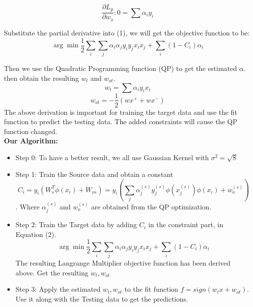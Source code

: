 \documentclass{article}
\begin{document}
\[ \dfrac{\partial L_p}{\partial w_o}:  0=\sum \alpha_iy_i\]

Substitute the partial derivative into (1), we will get the objective function to be: 
\begin{equation}
\arg \min \dfrac{1}{2}\sum_i\sum_j \alpha_i \alpha_j y_iy_jx_ix_j+\sum_i (1-C_i) \alpha_i
\end{equation}

Then we use the Quadratic Programming function (QP) to get the estimated $\alpha$. then obtain the resulting $w_t$ and $w_{ot}$.
\[w_t=\sum \alpha_iy_ix_i\]
\[w_{ot}=-\dfrac{1}{2}(wx^+ +wx^-)\]
The above derivation is important for training the target data and use the fit function to predict the testing data. The added constraints will cause the QP function changed. 
\\

\textbf{Our Algorithm:} 
\begin{itemize}
	\item Step 0: To have a better result, we all use Gaussian Kernel with $\sigma^2=\sqrt{8}$\\
	
	\item Step 1: Train the Source data and obtain a constant \[ C_i=y_i(W_s^T\phi(x_i)+W_{os})=
	y_i(\sum_j \alpha_j^{(s)} y_j^{(s)}\phi(x_j^{(s)} )\phi(x_i)+w_{o}^{(s)})\]. Where $\alpha_j^{(s)}$ and $w_{o}^{(s)}$ are obtained from the QP optimization.\\
	
	\item Step 2: Train the Target data by adding $C_i$ in the constraint part, in Equation (2).
	\begin{equation*}
	\arg \min \dfrac{1}{2}\sum_i\sum_j \alpha_i \alpha_j y_iy_jx_ix_j+\sum_i (1-C_i) \alpha_i
	\end{equation*} The resulting Langrange Multiplier objective function has been derived above. Get the resulting $w_t, w_{ot}$ \\
	
	\item Step 3: Apply the estimated $w_t, w_{ot}$ to the fit function $f=sign(w_t x+w_{ot})$.  Use it along with the Testing data to get the predictions. 
\end{itemize}
\end{document}
